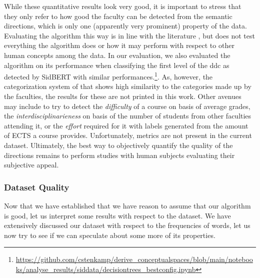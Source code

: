 
While these quantitative results look very good, it is important to stress that they only refer to how good the faculty can be detected from the semantic directions, which is only one (apparently very prominent) property of the data. Evaluating the algorithm this way is in line with the literature \mainalgos, but does not test everything the algorithm does or how it may perform with respect to other human concepts among the data. In our evaluation, we also evaluated the algorithm on its performance when classifying the first level of the \gls{ddc} as detected by SidBERT with similar performances.\footnote{\url{https://github.com/cstenkamp/derive_conceptualspaces/blob/main/notebooks/analyse_results/siddata/decisiontrees_bestconfig.ipynb}}. As, however, the categorization system of that shows high similarity to the categories made up by the faculties, the results for these are not printed in this work. Other avenues may include to try to detect the \textit{difficulty} of a course on basis of average grades, the \textit{interdisciplinarieness} on basis of the number of students from other faculties attending it, or the \textit{effort} required for it with labels generated from the amount of ECTS a course provides. Unfortunately, metrics are not present in the current dataset. Ultimately, the best way to objectively quantify the quality of the directions remains to perform studies with human subjects evaluating their subjective appeal.

\subsubsection{Dataset Quality}

Now that we have established that we have reason to assume that our algorithm is good, let us interpret some results with respect to the dataset. We have extensively discussed our dataset with respect to the frequencies of words, let us now try to see if we can speculate about some more of its properties.

